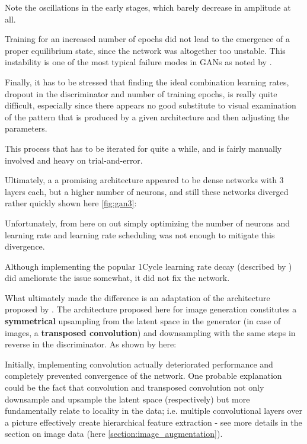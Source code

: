 Note the oscillations in the early stages, which barely decrease in amplitude at all. 

Training for an increased number of epochs did not lead to the emergence of a proper equilibrium state, since the network was altogether too unstable. This instability is one of the most typical failure modes in \acp{GAN} as noted by \cite{wiatrak2020stabilizing}.

\pagebreak 

Finally, it has to be stressed that finding the ideal combination learning rates, dropout in the discriminator and number of training epochs, is really quite difficult, especially since there appears no good substitute to visual examination of the pattern that is produced by a given architecture and then adjusting the parameters. 

This process that has to be iterated for quite a while, and is fairly manually involved and heavy on trial-and-error.
 
Ultimately, a a promising architecture appeared to be dense networks with 3 layers each, but a higher number of neurons, and still these networks diverged rather quickly shown here \ref{fig:gan3}:
 

Unfortunately, from here on out simply optimizing the number of neurons and learning rate and learning rate scheduling was not enough to mitigate this divergence. 

Although implementing the popular 1Cycle learning rate decay (described by \cite{smith_1cycle}) did ameliorate the issue somewhat, it did not fix the network.

\pagebreak

What ultimately made the difference is an adaptation of the architecture proposed by \cite{dcgan}. The architecture proposed here for image generation constitutes a \textbf{symmetrical} upsampling from the latent space in the generator (in case of images, a \textbf{transposed convolution}) and downsampling with the same steps in reverse in the discriminator. As shown by \cite{oversampling_gan} here:


Initially, implementing convolution actually deteriorated performance and completely prevented convergence of the network. One probable explanation could be the fact that convolution and transposed convolution not only downsample and upsample the latent space (respectively) but more fundamentally relate to locality in the data; i.e. multiple convolutional layers over a picture effectively create hierarchical feature extraction - see more details in the section on image data (here \ref{section:image_augmentation}). 

